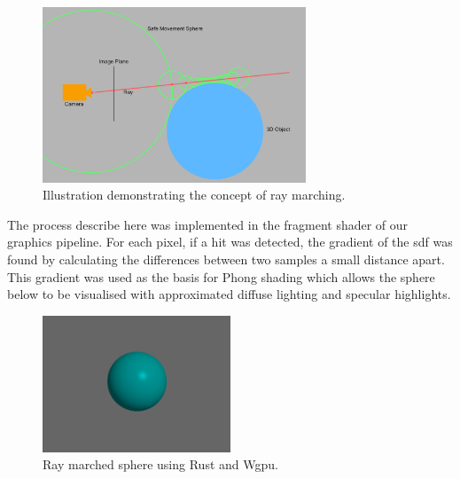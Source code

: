 \documentclass[titlepage]{article}
\begin{document}
\begin{figure}[htp]
    \centering
    \includegraphics[width=0.7\textwidth]{ray_marching.png}
    \caption{Illustration demonstrating the concept of ray marching.}
\end{figure}
\FloatBarrier

The process describe here was implemented in the fragment shader of our graphics pipeline. For each pixel, if a hit was detected, the gradient of the \acrshort{sdf} was found by calculating the differences between two samples a small distance apart. This gradient was used as the basis for Phong shading \cite{phong} which allows the sphere below to be visualised with approximated diffuse lighting and specular highlights.

\begin{figure}[htp]
    \centering
    \includegraphics[width=0.5\textwidth]{phong_shading.png}
    \caption{Ray marched sphere using Rust and Wgpu.}
\end{figure}
\FloatBarrier
\end{document}
